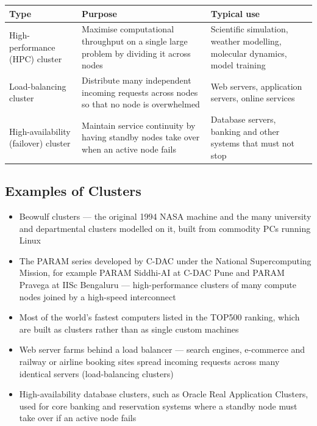 \begin{center}
\begin{tabularx}{\textwidth}{@{}p{3.6cm}LL@{}}
\toprule
\textbf{Type} & \textbf{Purpose} & \textbf{Typical use} \\
\midrule
High-performance (HPC) cluster & Maximise computational throughput on a
  single large problem by dividing it across nodes & Scientific simulation,
  weather modelling, molecular dynamics, model training \\
Load-balancing cluster & Distribute many independent incoming requests
  across nodes so that no node is overwhelmed & Web servers, application
  servers, online services \\
High-availability (failover) cluster & Maintain service continuity by having
  standby nodes take over when an active node fails & Database servers,
  banking and other systems that must not stop \\
\bottomrule
\end{tabularx}
\end{center}

\subsection{Examples of Clusters}

\begin{itemize}
  \item Beowulf clusters --- the original 1994 NASA machine and the many
        university and departmental clusters modelled on it, built from
        commodity PCs running Linux
  \item The PARAM series developed by C-DAC under the National
        Supercomputing Mission, for example PARAM Siddhi-AI at C-DAC Pune and
        PARAM Pravega at IISc Bengaluru --- high-performance clusters of many
        compute nodes joined by a high-speed interconnect~
  \item Most of the world's fastest computers listed in the TOP500 ranking,
        which are built as clusters rather than as single custom
        machines~
  \item Web server farms behind a load balancer --- search engines,
        e-commerce and railway or airline booking sites spread incoming
        requests across many identical servers (load-balancing clusters)
  \item High-availability database clusters, such as Oracle Real Application
        Clusters, used for core banking and reservation systems where a
        standby node must take over if an active node fails
\end{itemize}

